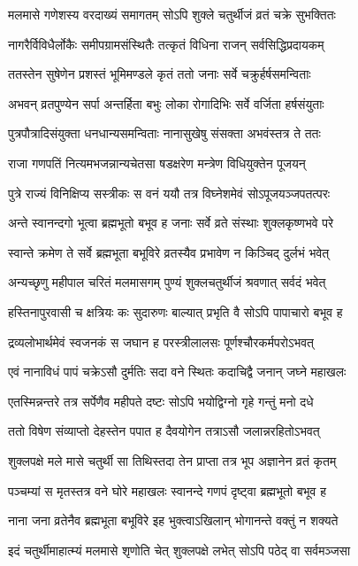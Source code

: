 \twolineshloka
{मलमासे गणेशस्य वरदाख्यं समागतम्}
{सोऽपि शुक्ले चतुर्थीजं व्रतं चक्रे सुभक्तितः} %

\twolineshloka
{नागरैर्विविधैर्लोकैः समीपग्रामसंस्थितैः}
{तत्कृतं विधिना राजन् सर्वसिद्धिप्रदायकम्} %

\twolineshloka
{ततस्तेन सुषेणेन प्रशस्तं भूमिमण्डले}
{कृतं ततो जनाः सर्वे चक्रुर्हर्षसमन्विताः} %

\twolineshloka
{अभवन् व्रतपुण्येन सर्पा अन्तर्हिता बभुः}
{लोका रोगादिभिः सर्वे वर्जिता हर्षसंयुताः} %

\twolineshloka
{पुत्रपौत्रादिसंयुक्ता धनधान्यसमन्विताः}
{नानासुखेषु संसक्ता अभवंस्तत्र ते ततः} %

\twolineshloka
{राजा गणपतिं नित्यमभजन्नान्यचेतसा}
{षडक्षरेण मन्त्रेण विधियुक्तेन पूजयन्} %

\twolineshloka
{पुत्रे राज्यं विनिक्षिप्य सस्त्रीकः स वनं ययौ}
{तत्र विघ्नेशमेवं सोऽपूजयञ्जपतत्परः} %

\twolineshloka
{अन्ते स्वानन्दगो भूत्वा ब्रह्मभूतो बभूव ह}
{जनाः सर्वे व्रते संस्थाः शुक्लकृष्णभवे परे} %

\twolineshloka
{स्वान्ते क्रमेण ते सर्वे ब्रह्मभूता बभूविरे}
{व्रतस्यैव प्रभावेण न किञ्चिद् दुर्लभं भवेत्} %

\twolineshloka
{अन्यच्छृणु महीपाल चरितं मलमासगम्}
{पुण्यं शुक्लचतुर्थीजं श्रवणात् सर्वदं भवेत्} %

\twolineshloka
{हस्तिनापुरवासी च क्षत्रियः कः सुदारुणः}
{बाल्यात् प्रभृति वै सोऽपि पापाचारो बभूव ह} %

\twolineshloka
{द्रव्यलोभार्थमेवं स्वजनकं स जघान ह}
{परस्त्रीलालसः पूर्णश्चौरकर्मपरोऽभवत्} %

\twolineshloka
{एवं नानाविधं पापं चक्रेऽसौ दुर्मतिः सदा}
{वने स्थितः कदाचिद्वै जनान् जघ्ने महाखलः} %

\twolineshloka
{एतस्मिन्नन्तरे तत्र सर्पेणैव महीपते}
{दष्टः सोऽपि भयोद्विग्नो गृहे गन्तुं मनो दधे} %

\twolineshloka
{ततो विषेण संव्याप्तो देहस्तेन पपात ह}
{दैवयोगेन तत्राऽसौ जलान्नरहितोऽभवत्} %

\twolineshloka
{शुक्लपक्षे मले मासे चतुर्थी सा तिथिस्तदा}
{तेन प्राप्ता तत्र भूप अज्ञानेन व्रतं कृतम्} %

\twolineshloka
{पञ्चम्यां स मृतस्तत्र वने घोरे महाखलः}
{स्वानन्दे गणपं दृष्ट्वा ब्रह्मभूतो बभूव ह} %

\twolineshloka
{नाना जना व्रतेनैव ब्रह्मभूता बभूविरे}
{इह भुक्त्वाऽखिलान् भोगानन्ते वक्तुं न शक्यते} %

\twolineshloka
{इदं चतुर्थीमाहात्म्यं मलमासे श‍ृणोति चेत्}
{शुक्लपक्षे लभेत् सोऽपि पठेद् वा सर्वमञ्जसा} %

